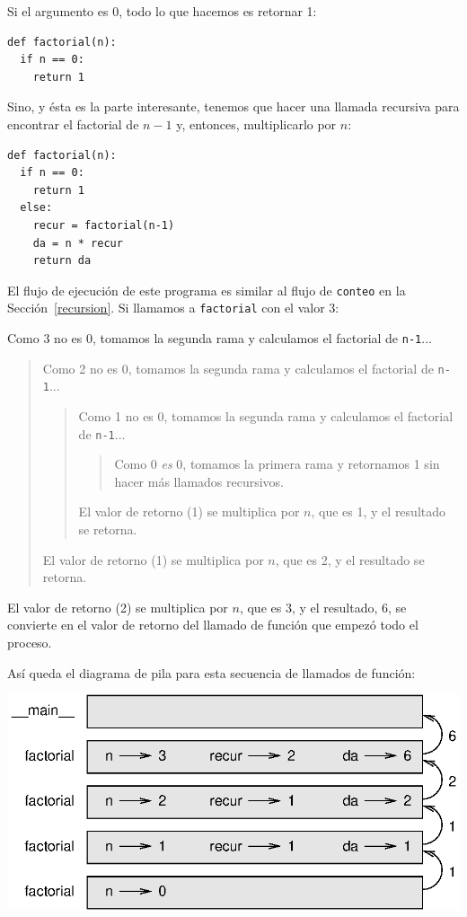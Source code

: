Si el argumento es 0, todo lo que hacemos es retornar 1:

\begin{verbatim}
def factorial(n):
  if n == 0:
    return 1
\end{verbatim}
 

Sino, y ésta es la parte interesante, tenemos que hacer una llamada
recursiva para encontrar el factorial de $n-1$ y, entonces, multiplicarlo
por $n$:
\begin{verbatim}
def factorial(n):
  if n == 0:
    return 1
  else:
    recur = factorial(n-1)
    da = n * recur
    return da
\end{verbatim}

El flujo de ejecución de este programa es similar al flujo de \texttt{conteo}
en la Sección~\ref{recursion}. Si llamamos a \texttt{factorial}
con el valor 3:


Como 3 no es 0, tomamos la segunda rama y calculamos el factorial
de \texttt{n-1}...
\begin{quote}
Como 2 no es 0, tomamos la segunda rama y calculamos el factorial
de \texttt{n-1}...

\begin{quote}
Como 1 no es 0, tomamos la segunda rama y calculamos el factorial
de \texttt{n-1}...

\begin{quote}
Como 0 {\em es} 0, tomamos la primera rama y retornamos 1 sin hacer
más llamados recursivos. 
\end{quote}
El valor de retorno (1) se multiplica por $n$, que es 1, y el resultado
se retorna. 
\end{quote}
El valor de retorno (1) se multiplica por $n$, que es 2, y el resultado
se retorna. 
\end{quote}
El valor de retorno (2) se multiplica por $n$, que es 3, y el resultado,
6, se convierte en el valor de retorno del llamado de función que
empezó todo el proceso.

Así queda el diagrama de pila para esta secuencia de llamados de función:

\vspace{0.1in}
 \beforefig \centerline{\includegraphics{illustrations/stack3}}
\afterfig \vspace{0.1in}

